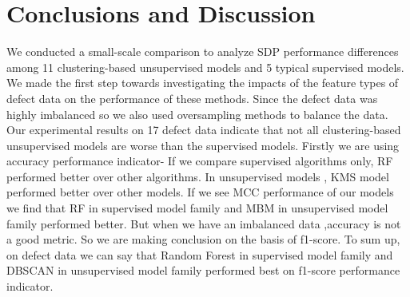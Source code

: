 \chapter{Conclusions and Discussion}\label{final}

We conducted a small-scale comparison to analyze SDP performance differences among 11 clustering-based unsupervised models and 5 typical supervised models. We made the first step towards investigating the impacts of the feature types of defect data on the performance of these methods. Since the defect data was highly imbalanced so we also used oversampling methods to balance the data.\newline
Our experimental results on 17 defect data indicate that not all clustering-based unsupervised models are worse than the supervised models.\newline
Firstly we are using accuracy performance indicator-\newline
If we compare supervised algorithms only, RF performed better over other algorithms. In unsupervised models , KMS model performed better over other models.\newline
If we see MCC performance of our models we find that RF in supervised model family and MBM in unsupervised model family performed better.\newline
But when we have an imbalanced data ,accuracy is not a good metric.
So we are making conclusion on the basis of f1-score.\newline
To sum up, on defect data we can say that Random Forest in supervised model family and DBSCAN in  unsupervised model family performed best on f1-score performance indicator.

